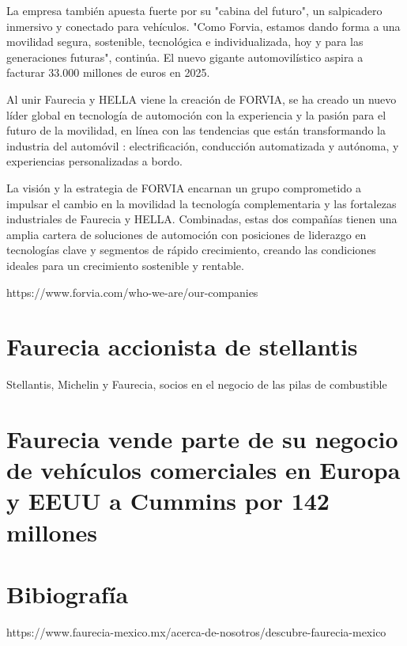 \documentclass[letterpaper,12pt]{article}
\begin{document}
\begin{sloppypar}
La empresa también apuesta fuerte por su "cabina del futuro", un salpicadero inmersivo y conectado para vehículos. "Como Forvia, estamos dando forma a una movilidad segura, sostenible, tecnológica e individualizada, hoy y para las generaciones futuras", continúa. El nuevo gigante automovilístico aspira a facturar 33.000 millones de euros en 2025.

Al unir Faurecia y HELLA viene la creación de FORVIA, se ha creado un nuevo líder global en tecnología de automoción con la experiencia y la pasión para el futuro de la movilidad, en línea con las tendencias que están transformando la industria del automóvil : electrificación, conducción automatizada y autónoma, y experiencias personalizadas a bordo.

La visión y la estrategia de FORVIA encarnan un grupo comprometido a impulsar el cambio en la movilidad la tecnología complementaria y las fortalezas industriales de Faurecia y HELLA. Combinadas, estas dos compañías tienen una amplia cartera de soluciones de automoción con posiciones de liderazgo en tecnologías clave y segmentos de rápido crecimiento, creando las condiciones ideales para un crecimiento sostenible y rentable.

https://www.forvia.com/who-we-are/our-companies

\section*{Faurecia accionista de stellantis }


Stellantis, Michelin y Faurecia, socios en el negocio de las pilas de combustible

\section*{Faurecia vende parte de su negocio de vehículos comerciales en Europa y EEUU a Cummins por 142 millones}


\section*{Bibiografía}
https://www.faurecia-mexico.mx/acerca-de-nosotros/descubre-faurecia-mexico

\end{sloppypar}
\end{document}
